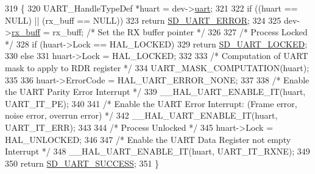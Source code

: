 \begin{DoxyCode}
319 \{
320     UART\_HandleTypeDef *huart = dev->\mbox{\hyperlink{structsd__uart__dev_a31b2a452cffe839ac4a3bf86eddc16b0}{uart}};
321     
322     \textcolor{keywordflow}{if} ((huart == NULL) || (rx\_buff == NULL))
323         \textcolor{keywordflow}{return} \mbox{\hyperlink{group___s_d___u_a_r_t___types_ggaff649a266fb34035c10733370c4fd104ad77d98472c0c3bb192d745b3389de08d}{SD\_UART\_ERROR}};
324                         
325     dev->\mbox{\hyperlink{structsd__uart__dev_a2bc17c33f4234299b83ba5d98edd5887}{rx\_buff}} = rx\_buff;    \textcolor{comment}{/* Set the RX buffer pointer */}
326        
327     \textcolor{comment}{/* Process Locked */}            
328     \textcolor{keywordflow}{if} (huart->Lock == HAL\_LOCKED) 
329         \textcolor{keywordflow}{return} \mbox{\hyperlink{group___s_d___u_a_r_t___types_ggaff649a266fb34035c10733370c4fd104a81ad9d26004338f6c20d9a1ed5232662}{SD\_UART\_LOCKED}};
330     \textcolor{keywordflow}{else}
331         huart->Lock = HAL\_LOCKED;
332 
333     \textcolor{comment}{/* Computation of UART mask to apply to RDR register */}
334     UART\_MASK\_COMPUTATION(huart);
335 
336     huart->ErrorCode = HAL\_UART\_ERROR\_NONE;
337 
338     \textcolor{comment}{/* Enable the UART Parity Error Interrupt */}
339     \_\_HAL\_UART\_ENABLE\_IT(huart, UART\_IT\_PE);
340 
341     \textcolor{comment}{/* Enable the UART Error Interrupt: (Frame error, noise error, overrun error) */}
342     \_\_HAL\_UART\_ENABLE\_IT(huart, UART\_IT\_ERR);
343 
344     \textcolor{comment}{/* Process Unlocked */}
345     huart->Lock = HAL\_UNLOCKED;
346 
347     \textcolor{comment}{/* Enable the UART Data Register not empty Interrupt */}
348     \_\_HAL\_UART\_ENABLE\_IT(huart, UART\_IT\_RXNE);
349 
350     \textcolor{keywordflow}{return} \mbox{\hyperlink{group___s_d___u_a_r_t___types_ggaff649a266fb34035c10733370c4fd104a3b6fe085405a5d58c55226fd59f01994}{SD\_UART\_SUCCESS}};
351 \}
\end{DoxyCode}
\mbox{\label{group___s_d___u_a_r_t___functions_ga8170b7c747d603b269242afa8de67164}} 
